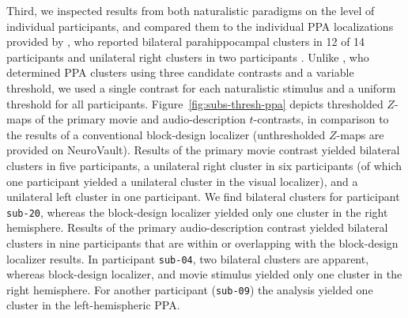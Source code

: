\documentclass[english]{article}
\begin{document}
Third, we inspected results from both naturalistic paradigms on the level of
individual participants, and compared them to the individual PPA localizations
provided by \cite{sengupta2016extension}, who reported
bilateral parahippocampal clusters in 12 of 14
participants and unilateral right clusters in two participants
\citep[Tab.~3 in][]{sengupta2016extension}.
Unlike \cite{sengupta2016extension}, who determined PPA clusters using three
candidate contrasts and a variable threshold, we used a single contrast for
each naturalistic stimulus and a uniform threshold for all participants.
Figure~\ref{fig:subs-thresh-ppa} depicts thresholded $Z$-maps of the primary movie
and audio-description $t$-contrasts, in comparison to the results of a conventional
block-design localizer (unthresholded $Z$-maps are provided on NeuroVault).
Results of the primary movie contrast yielded bilateral clusters in five participants,
a unilateral right cluster in six participants (of which one participant yielded a
unilateral cluster in the visual localizer), and a unilateral left cluster in
one participant.
We find bilateral clusters for participant \texttt{sub-20}, whereas the block-design
localizer yielded only one cluster in the right hemisphere.
Results of the primary audio-description contrast yielded bilateral clusters in nine participants that are within or overlapping with the block-design localizer results.
In participant \texttt{sub-04}, two bilateral clusters are apparent, whereas
block-design localizer, and movie stimulus yielded only one cluster in the right
hemisphere.
For another participant (\texttt{sub-09}) the analysis yielded one cluster in the
left-hemispheric PPA.
\end{document}
